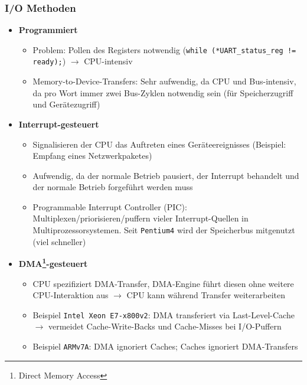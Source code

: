 \subsubsection{I/O Methoden}
\begin{itemize}
	\item \textbf{Programmiert}
	\begin{itemize}
		\item Problem: Pollen des Registers notwendig (\texttt{while (*UART\_status\_reg != ready);}) \(\rightarrow\) CPU-intensiv
		\item Memory-to-Device-Transfers: Sehr aufwendig, da CPU und Bus-intensiv, da pro Wort immer zwei Bus-Zyklen notwendig sein (für Speicherzugriff und Gerätezugriff)
	\end{itemize}
	\item \textbf{Interrupt-gesteuert}
	\begin{itemize}
		\item Signalisieren der CPU das Auftreten eines Geräteereignisses (Beispiel: Empfang eines Netzwerkpaketes)
		\item Aufwendig, da der normale Betrieb pausiert, der Interrupt behandelt und der normale Betrieb forgeführt werden muss
		\item Programmable Interrupt Controller (PIC): Multiplexen/priorisieren/puffern vieler Interrupt-Quellen in Multiprozessorsystemen. Seit \texttt{Pentium4} wird der Speicherbus mitgenutzt (viel schneller)
	\end{itemize}
	\item \textbf{DMA\footnote{Direct Memory Access}-gesteuert}
	\begin{itemize}
		\item CPU spezifiziert DMA-Transfer, DMA-Engine führt diesen ohne weitere CPU-Interaktion aus \(\rightarrow\) CPU kann während Transfer weiterarbeiten
		\item Beispiel \texttt{Intel Xeon E7-x800v2}: DMA transferiert via Last-Level-Cache \(\rightarrow\) vermeidet Cache-Write-Backs und Cache-Misses bei I/O-Puffern
		\item Beispiel \texttt{ARMv7A}: DMA ignoriert Caches; Caches ignoriert DMA-Transfers
	\end{itemize}
\end{itemize}

